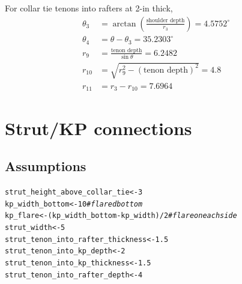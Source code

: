 \documentclass{article}\usepackage[]{graphicx}\usepackage[]{xcolor}
\makeatletter
\newcommand{\hlnum}[1]{\textcolor[rgb]{0.686,0.059,0.569}{#1}}%
\newcommand{\hlcom}[1]{\textcolor[rgb]{0.678,0.584,0.686}{\textit{#1}}}%
\newcommand{\hlopt}[1]{\textcolor[rgb]{0,0,0}{#1}}%
\newcommand{\hlstd}[1]{\textcolor[rgb]{0.345,0.345,0.345}{#1}}%
\newcommand{\hlkwb}[1]{\textcolor[rgb]{0.69,0.353,0.396}{#1}}%
\newenvironment{kframe}{%
 \def\at@end@of@kframe{}%
 \ifinner\ifhmode%
  \def\at@end@of@kframe{\end{minipage}}%
  \begin{minipage}{\columnwidth}%
 \fi\fi%
 \def\FrameCommand##1{\hskip\@totalleftmargin \hskip-\fboxsep
 \colorbox{shadecolor}{##1}\hskip-\fboxsep
     \hskip-\linewidth \hskip-\@totalleftmargin \hskip\columnwidth}%
 \MakeFramed {\advance\hsize-\width
   \@totalleftmargin\z@ \linewidth\hsize
   \@setminipage}}%
 {\par\unskip\endMakeFramed%
 \at@end@of@kframe}
\newenvironment{knitrout}{}{} %
\makeatother
\begin{document}
For collar tie tenons into rafters at 2-in thick, 
\begin{align*}
  \theta_3 &= \arctan \left( \frac{\text{shoulder depth}}{r_3} \right) = 4.5752^\circ\\
  \theta_4 &= \theta - \theta_3 = 35.2303^\circ\\
  r_9 &= \frac{\text{tenon depth}}{\sin\theta} = 6.2482\\
  r_{10} &= \sqrt{r_9^2 - (\text{tenon depth})^2} = 4.8\\
  r_{11} &= r_3 - r_{10} = 7.6964
\end{align*}

















\section{Strut/KP connections} \label{strut-kp-connections}

\subsection{Assumptions} \label{strut-kp-connections-assumptions}
\begin{knitrout}
\color{fgcolor}\begin{kframe}
\begin{alltt}
\hlstd{strut_height_above_collar_tie} \hlkwb{<-} \hlnum{3}
\hlstd{kp_width_bottom} \hlkwb{<-} \hlnum{10} \hlcom{# flared bottom}
\hlstd{kp_flare} \hlkwb{<-} \hlstd{(kp_width_bottom} \hlopt{-} \hlstd{kp_width)}\hlopt{/}\hlnum{2} \hlcom{# flare on each side}
\hlstd{strut_width} \hlkwb{<-} \hlnum{5}
\hlstd{strut_tenon_into_rafter_thickness} \hlkwb{<-} \hlnum{1.5}
\hlstd{strut_tenon_into_kp_depth} \hlkwb{<-} \hlnum{2}
\hlstd{strut_tenon_into_kp_thickness} \hlkwb{<-} \hlnum{1.5}
\hlstd{strut_tenon_into_rafter_depth} \hlkwb{<-} \hlnum{4}
\end{alltt}
\end{kframe}
\end{knitrout}
\end{document}
